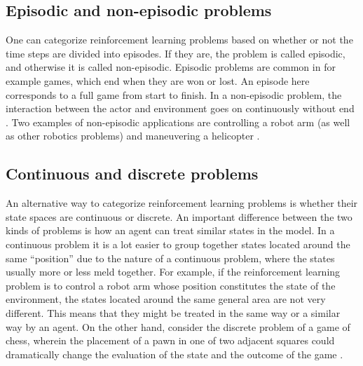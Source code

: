 \subsection{Episodic and non-episodic problems}
One can categorize reinforcement learning problems based on whether or not the time steps are divided into episodes. If they are, the problem is called episodic, and otherwise it is called non-episodic. Episodic problems are common in for example games, which end when they are won or lost. An episode here corresponds to a full game from start to finish. In a non-episodic problem, the interaction between the actor and environment goes on continuously without end \parencite{barto1998reinforcement}. Two examples of non-episodic applications are controlling a robot arm (as well as other robotics problems) and maneuvering a helicopter \parencite{ng2006autonomous}. 

\subsection{Continuous and discrete problems}
An alternative way to categorize reinforcement learning problems is whether their state spaces are continuous or discrete. An important difference between the two kinds of problems is how an agent can treat similar states in the model. In a continuous problem it is a lot easier to group together states located around the same ``position'' due to the nature of a continuous problem, where the states usually more or less meld together. For example, if the reinforcement learning problem is to control a robot arm whose position constitutes the state of the environment, the states located around the same general area are not very different. This means that they might be treated in the same way or a similar way by an agent. On the other hand, consider the discrete problem of a game of chess, wherein the placement of a pawn in one of two adjacent squares could dramatically change the evaluation of the state and the outcome of the game \parencite{barto1998reinforcement}.
